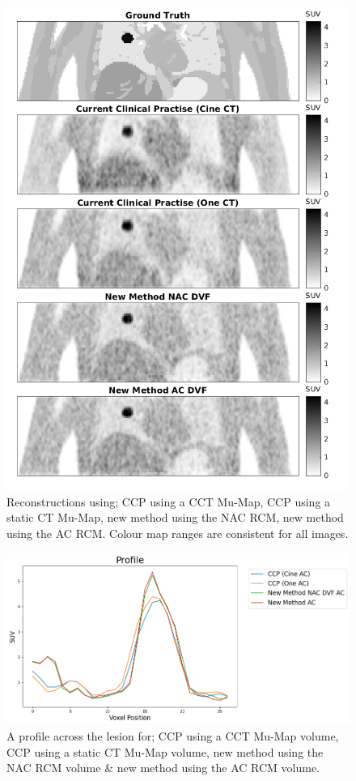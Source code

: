     \begin{figure}
        \vspace{-0.5cm}
        \centering
        \includegraphics[width=0.75\linewidth]{figures/visual_analysis.png}
        \captionsetup{singlelinecheck=false, justification=centering}
        \caption{Reconstructions using; \gls{CCP} using a \gls{CCT} \gls{Mu-Map}, \gls{CCP} using a static \gls{CT} \gls{Mu-Map}, new method using the \gls{NAC} \gls{RCM}, new method using the \gls{AC} \gls{RCM}. Colour map ranges are consistent for all images.}
        \label{fig:visual_analysis}
        \vspace{-0.5cm}
    \end{figure}
    
    \begin{figure}
        \vspace{-0.0cm}
        \centering
        \includegraphics[width=0.75\linewidth]{figures/profile.png}
        \captionsetup{singlelinecheck=false, justification=centering}
        \caption{A profile across the lesion for; \gls{CCP} using a \gls{CCT} \gls{Mu-Map} volume, \gls{CCP} using a static \gls{CT} \gls{Mu-Map} volume, new method using the \gls{NAC} \gls{RCM} volume \& new method using the \gls{AC} \gls{RCM} volume.}
        \label{fig:profile}
        \vspace{-0.5cm}
    \end{figure}
    
